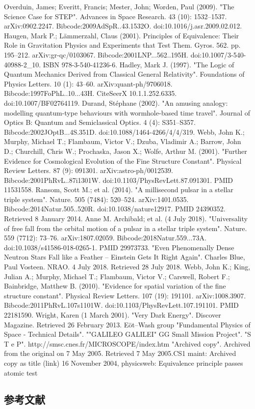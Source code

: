 \begin{enumerate}
Overduin, James; Everitt, Francis; Mester, John; Worden, Paul (2009). "The Science Case for STEP". Advances in Space Research. 43 (10): 1532–1537. arXiv:0902.2247. Bibcode:2009AdSpR..43.1532O. doi:10.1016/j.asr.2009.02.012.
Haugen, Mark P.; Lämmerzahl, Claus (2001). Principles of Equivalence: Their Role in Gravitation Physics and Experiments that Test Them. Gyros. 562. pp. 195–212. arXiv:gr-qc/0103067. Bibcode:2001LNP...562..195H. doi:10.1007/3-540-40988-2_10. ISBN 978-3-540-41236-6.
Hadley, Mark J. (1997). "The Logic of Quantum Mechanics Derived from Classical General Relativity". Foundations of Physics Letters. 10 (1): 43–60. arXiv:quant-ph/9706018. Bibcode:1997FoPhL..10...43H. CiteSeerX 10.1.1.252.6335. doi:10.1007/BF02764119.
Durand, Stéphane (2002). "An amusing analogy: modelling quantum-type behaviours with wormhole-based time travel". Journal of Optics B: Quantum and Semiclassical Optics. 4 (4): S351–S357. Bibcode:2002JOptB...4S.351D. doi:10.1088/1464-4266/4/4/319.
Webb, John K.; Murphy, Michael T.; Flambaum, Victor V.; Dzuba, Vladimir A.; Barrow, John D.; Churchill, Chris W.; Prochaska, Jason X.; Wolfe, Arthur M. (2001). "Further Evidence for Cosmological Evolution of the Fine Structure Constant". Physical Review Letters. 87 (9): 091301. arXiv:astro-ph/0012539. Bibcode:2001PhRvL..87i1301W. doi:10.1103/PhysRevLett.87.091301. PMID 11531558.
Ransom, Scott M.; et al. (2014). "A millisecond pulsar in a stellar triple system". Nature. 505 (7484): 520–524. arXiv:1401.0535. Bibcode:2014Natur.505..520R. doi:10.1038/nature12917. PMID 24390352. Retrieved 8 January 2014.
Anne M. Archibald; et al. (4 July 2018). "Universality of free fall from the orbital motion of a pulsar in a stellar triple system". Nature. 559 (7712): 73–76. arXiv:1807.02059. Bibcode:2018Natur.559...73A. doi:10.1038/s41586-018-0265-1. PMID 29973733.
"Even Phenomenally Dense Neutron Stars Fall like a Feather – Einstein Gets It Right Again". Charles Blue, Paul Vosteen. NRAO. 4 July 2018. Retrieved 28 July 2018.
Webb, John K.; King, Julian A.; Murphy, Michael T.; Flambaum, Victor V.; Carswell, Robert F.; Bainbridge, Matthew B. (2010). "Evidence for spatial variation of the fine structure constant". Physical Review Letters. 107 (19): 191101. arXiv:1008.3907. Bibcode:2011PhRvL.107s1101W. doi:10.1103/PhysRevLett.107.191101. PMID 22181590.
Wright, Karen (1 March 2001). "Very Dark Energy". Discover Magazine. Retrieved 26 February 2013.
Eöt–Wash group
"Fundamental Physics of Space - Technical Details".
""GALILEO GALILEI" GG Small Mission Project".
"S T e P".
http://smsc.cnes.fr/MICROSCOPE/index.htm
"Archived copy". Archived from the original on 7 May 2005. Retrieved 7 May 2005.CS1 maint: Archived copy as title (link)
16 November 2004, physicsweb: Equivalence principle passes atomic test
\end{enumerate}


\subsection{参考文献}